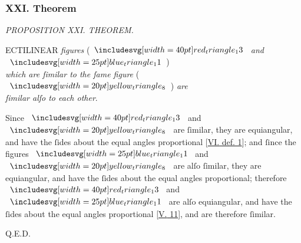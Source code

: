 \documentclass[12pt,preview]{standalone}
\begin{document}
\subsubsection{XXI. Theorem}

\begin{minipage}[t]{0.33\textwidth}
    \vspace{40pt}
    
\end{minipage}%
\hfill
\begin{minipage}[t]{0.64\textwidth}
    \vspace{0pt}

    \begin{center}
        \textit{PROPOSITION XXI. THEOREM.}\label{book6pr21} \\
    \end{center}

    \hfill

    \begin{center}
        \raggedright \lettrine[lines=4, loversize=1, nindent=0pt]{}{}ECTILINEAR \textit{figures} (\hspace{-1ex}$\img[0][0][40]{red_triangle_13}$ \textit{and} $\img{blue_triangle_11}$\hspace{-1ex})\\ \textit{which are ſimilar to the ſame figure} (\hspace{-1ex}$\img[0][0][20]{yellow_triangle_8}$\hspace{-1ex}) \textit{are\\ ſimilar alſo to each other}.
    \end{center}

    \hfill

    \hfill

    \raggedright Since $\img[0][0][40]{red_triangle_13}$ and $\img[0][0][20]{yellow_triangle_8}$ are ſimilar, they are equiangular, and have the ſides about the equal angles proportional [\hyperref[book6def1]{\textsc{VI.} def. 1}]; and ſince the figures $\img{blue_triangle_11}$ and $\img[0][0][20]{yellow_triangle_8}$ are alſo ſimilar, they are equiangular, and have the ſides about the equal angles proportional; therefore $\img[0][0][40]{red_triangle_13}$ and $\img{blue_triangle_11}$ are alſo equiangular, and have the ſides about the equal angles proportional [\hyperref[book5pr11]{\textsc{V.} 11}], and are therefore ſimilar.

    \hfill

    \hfill Q.E.D.
\end{minipage}%
\end{document}
